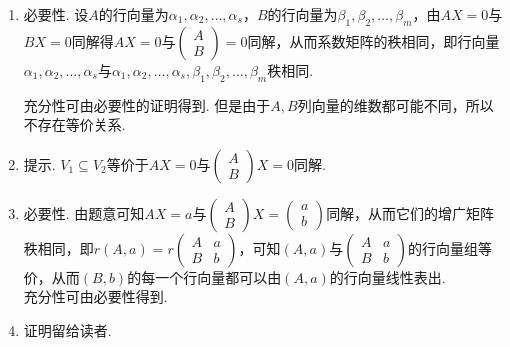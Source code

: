 \documentclass[UTF8,12pt,a4paper,fontset=fandol]{ctexart}
\begin{document}
\begin{solve}
\begin{enumerate}
                \item 必要性. 设$A$的行向量为$\alpha_1,\alpha_2,\ldots,\alpha_s$，$B$的行向量为$\beta_1,\beta_2,\ldots,\beta_m$，由$AX=0$与$BX=0$同解得$AX=0$与$\begin{pmatrix}A \\ B\end{pmatrix}=0$同解，从而系数矩阵的秩相同，即行向量$\alpha_1,\alpha_2,\ldots,\alpha_s$与$\alpha_1,\alpha_2,\ldots,\alpha_s,\beta_1,\beta_2,\ldots,\beta_m$秩相同. 

                      充分性可由必要性的证明得到. 但是由于$A,B$列向量的维数都可能不同，所以不存在等价关系.

                \item 提示. $V_1\subseteq V_2$等价于$AX=0$与$\begin{pmatrix}
                              A \\
                              B
                          \end{pmatrix}X=0$同解.

                \item 必要性. 由题意可知$AX=a$与$\begin{pmatrix} A \\ B \end{pmatrix}X=\begin{pmatrix} a \\ b \end{pmatrix}$同解，从而它们的增广矩阵秩相同，即$r(A,a)=r\begin{pmatrix}
                              A & a \\
                              B & b
                          \end{pmatrix}$，可知$(A,a)$与$\begin{pmatrix}
                              A & a \\
                              B & b
                          \end{pmatrix}$的行向量组等价，从而$(B,b)$的每一个行向量都可以由$(A,a)$的行向量线性表出.\\
                      充分性可由必要性得到.

                \item 证明留给读者.
            \end{enumerate}
\end{solve}
\end{document}
